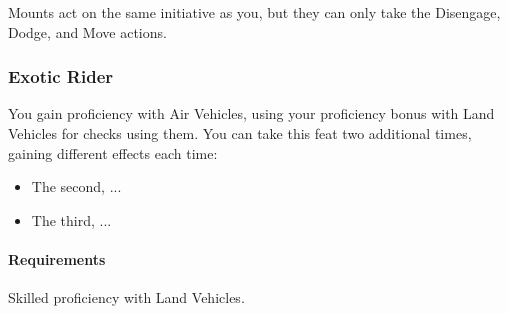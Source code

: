     Mounts act on the same initiative as you, but they can only take the Disengage, Dodge, and Move actions.
\subsubsection{Exotic Rider} \label{feat::exoticrider}
    You gain proficiency with Air Vehicles, using your proficiency bonus with Land Vehicles for checks using them.
    You can take this feat two additional times, gaining different effects each time:
    \begin{itemize}
        \item The second, ...
        \item The third, ... %
    \end{itemize}
    \paragraph{Requirements} Skilled proficiency with Land Vehicles.

